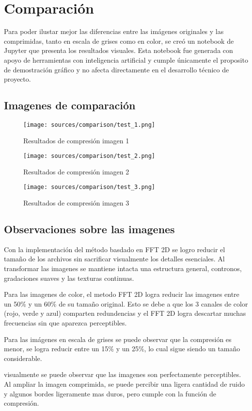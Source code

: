 \section{Comparación}

Para poder ilustar mejor las diferencias entre las imágenes originales y las comprimidas, tanto en escala de grises como en color, se creó un notebook de Jupyter que presenta los resultados visuales. Esta notebook fue generada con apoyo de herramientas con inteligencia artificial y cumple únicamente el proposito de demostración gráfico y no afecta directamente en el desarrollo técnico de proyecto.

\subsection{Imagenes de comparación}

\begin{figure}[htbp]
  \centering
  \texttt{[image: sources/comparison/test\_1.png]}
  \caption{Resultados de compresión imagen 1}\label{fig:comparison1}
\end{figure}

\begin{figure}[htbp]
  \centering
  \texttt{[image: sources/comparison/test\_2.png]}
  \caption{Resultados de compresión imagen 2}\label{fig:comparison2}
\end{figure}

\begin{figure}[htbp]
  \centering
  \texttt{[image: sources/comparison/test\_3.png]}
  \caption{Resultados de compresión imagen 3}\label{fig:comparison3}
\end{figure}

\subsection{Observaciones sobre las imagenes}

Con la implementación del método basdado en FFT 2D se logro reducir el tamaño de los archivos sin sacrificar visualmente los detalles esenciales. Al transformar las imagenes se mantiene intacta una estructura general, contronos, gradaciones suaves y las texturas continuas.

Para las imagenes de color, el metodo FFT 2D logra reducir las imagenes entre un 50\% y un 60\% de su tamaño original. Esto se debe a que los 3 canales de color (rojo, verde y azul) comparten redundencias y el FFT 2D logra descartar muchas frecuencias sin que aparezca perceptibles.

Para las imágenes en escala de grises se puede observar que la compresión es menor, se logra reducir entre un 15\% y un 25\%, lo cual sigue siendo un tamaño considerable.

visualmente se puede observar que las imagenes son perfectamente perceptibles. Al ampliar la imagen comprimida, se puede percibir una ligera cantidad de ruido y algunos bordes ligeramente mas duros, pero cumple con la función de compresión.